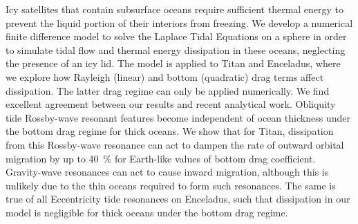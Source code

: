 Icy satellites that contain subsurface oceans require sufficient thermal energy to prevent the liquid portion of their interiors from freezing. We develop a numerical finite difference model to solve the Laplace Tidal Equations on a sphere in order to simulate tidal flow and thermal energy dissipation in these oceans, neglecting the presence of an icy lid. The model is applied to Titan and Enceladus, where we explore how Rayleigh (linear) and bottom (quadratic) drag terms affect dissipation. The latter drag regime can only be applied numerically. We find excellent agreement between our results and recent analytical work. Obliquity tide Rossby-wave resonant features become independent of ocean thickness under the bottom drag regime for thick oceans. We show that for Titan, dissipation from this Rossby-wave resonance can act to dampen the rate of outward orbital migration by up to \SI{40}{\percent} for Earth-like values of bottom drag coefficient. Gravity-wave resonances can act to cause inward migration, although this is unlikely due to the thin oceans required to form such resonances. The same is true of all Eccentricity tide resonances on Enceladus, such that dissipation in our model is negligible for thick oceans under the bottom drag regime.  